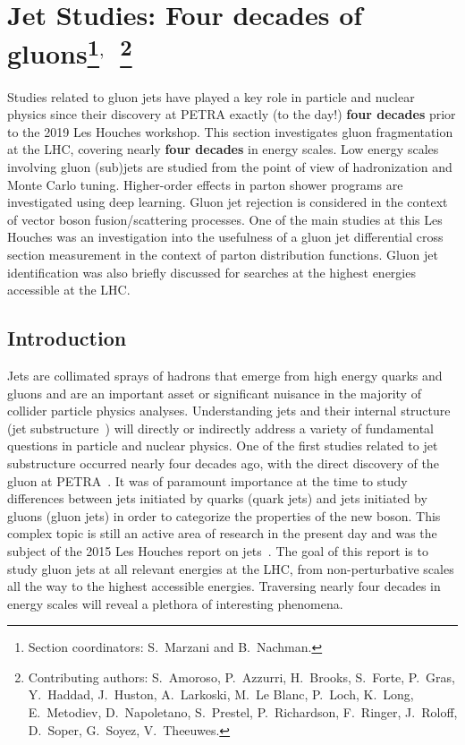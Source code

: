 \documentclass[11pt]{cernrep}
\begin{document}
\section{Jet Studies: Four decades of gluons\protect\footnote{Section coordinators: S.~Marzani and B.~Nachman.}$^{,}$~\protect\footnote{Contributing authors: S.~Amoroso, P.~Azzurri, H.~Brooks, S.~Forte, P.~Gras, Y.~Haddad, J.~Huston, A.~Larkoski, M.~Le Blanc, P.~Loch, K.~Long, E.~Metodiev, D.~Napoletano, S.~Prestel, P.~Richardson, F.~Ringer, J.~Roloff, D.~Soper, G.~Soyez, V.~Theeuwes.}}

Studies related to gluon jets have played a key role in particle and nuclear physics since their discovery at PETRA exactly (to the day!) \textbf{four decades} prior to the 2019 Les Houches workshop.  This section investigates gluon fragmentation at the LHC, covering nearly \textbf{four decades} in energy scales.  Low energy scales involving gluon (sub)jets are studied from the point of view of hadronization and Monte Carlo tuning.  Higher-order effects in parton shower programs are investigated using deep learning.  Gluon jet rejection is considered in the context of vector boson fusion/scattering processes.  One of the main studies at this Les Houches was an investigation into the usefulness of a gluon jet differential cross section measurement in the context of parton distribution functions.  Gluon jet identification was also briefly discussed for searches at the highest energies accessible at the LHC.

\subsection{Introduction}
\label{sec:jets:intro}

Jets are collimated sprays of hadrons that emerge from high energy quarks and gluons and are an important asset or significant nuisance in the majority of collider particle physics analyses.  Understanding jets and their internal structure (jet substructure~\cite{Abdesselam:2010pt,Altheimer:2012mn,Altheimer:2013yza,Adams:2015hiv,Asquith:2018igt,Larkoski:2017jix,Marzani:2019hun}) will directly or indirectly address a variety of fundamental questions in particle and nuclear physics.  One of the first studies related to jet substructure occurred nearly four decades ago, with the direct discovery of the gluon at PETRA~\cite{Brandelik:1979bd,Barber:1979yr,Berger:1979cj,Bartel:1979ut,Ellis:2014rma}.  It was of paramount importance at the time to study differences between jets initiated by quarks (quark jets) and jets initiated by gluons (gluon jets) in order to categorize the properties of the new boson.  This complex topic is still an active area of research in the present day and was the subject of the 2015 Les Houches report on jets~\cite{Badger:2016bpw,Gras:2017jty}.   The goal of this report is to study gluon jets at all relevant energies at the LHC, from non-perturbative scales all the way to the highest accessible energies.   Traversing nearly four decades in energy scales will reveal a plethora of interesting phenomena.  
\end{document}
